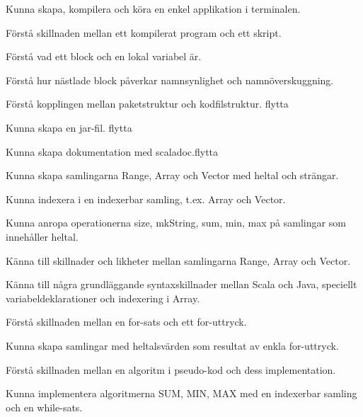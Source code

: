 
\item Kunna skapa, kompilera och köra en enkel applikation i terminalen.
\item Förstå skillnaden mellan ett kompilerat program och ett skript.

\item Förstå vad ett block och en lokal variabel är.
\item Förstå hur nästlade block påverkar namnsynlighet och namnöverskuggning.
\item Förstå kopplingen mellan paketstruktur och kodfilstruktur. \TODO flytta 
\item Kunna skapa en jar-fil. \TODO flytta 
\item Kunna skapa dokumentation med scaladoc.\TODO flytta 
\item Kunna skapa samlingarna Range, Array och Vector med heltal och strängar.
\item Kunna indexera i en indexerbar samling, t.ex. Array och Vector.
\item Kunna anropa operationerna size, mkString, sum, min, max på samlingar som innehåller heltal.
\item Känna till skillnader och likheter mellan samlingarna Range, Array och Vector.
\item Känna till några grundläggande syntaxskillnader mellan Scala och Java, speciellt variabeldeklarationer och indexering i Array.
\item Förstå skillnaden mellan en for-sats och ett for-uttryck.
\item Kunna skapa samlingar med heltalsvärden som resultat av enkla for-uttryck.
\item Förstå skillnaden mellan en algoritm i pseudo-kod och dess implementation.
\item Kunna implementera algoritmerna SUM, MIN, MAX med en indexerbar samling och en while-sats.
